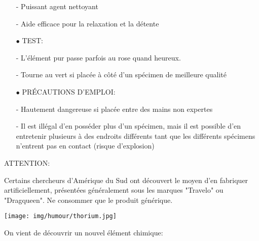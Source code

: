 \begin{itemize}
- Puissant agent nettoyant

- Aide efficace pour la relaxation et la détente

	\item[$\bullet$] TEST: 

- L'élément pur passe parfois au rose quand heureux.

- Tourne au vert si placée à côté d'un spécimen de meilleure qualité

	\item[$\bullet$] PRÉCAUTIONS D'EMPLOI:

- Hautement dangereuse si placée entre des mains non expertes

- Il est illégal d'en posséder plus d'un spécimen, mais il est possible d'en entretenir plusieurs à des endroits différents tant que les différents spécimens n'entrent pas en contact (risque d'explosion)

\end{itemize}

ATTENTION: 

Certains chercheurs d'Amérique du Sud ont découvert le moyen d'en fabriquer artificiellement, présentées généralement sous les marques "Travelo" ou "Dragqueen". Ne consommer que le produit générique.

	\begin{center}\underline{\hspace{5 cm}}\end{center}

	\begin{center}
	\texttt{[image: img/humour/thorium.jpg]}
	\end{center}
	
	\begin{center}\underline{\hspace{5 cm}}\end{center}

On vient de découvrir un nouvel élément chimique:

